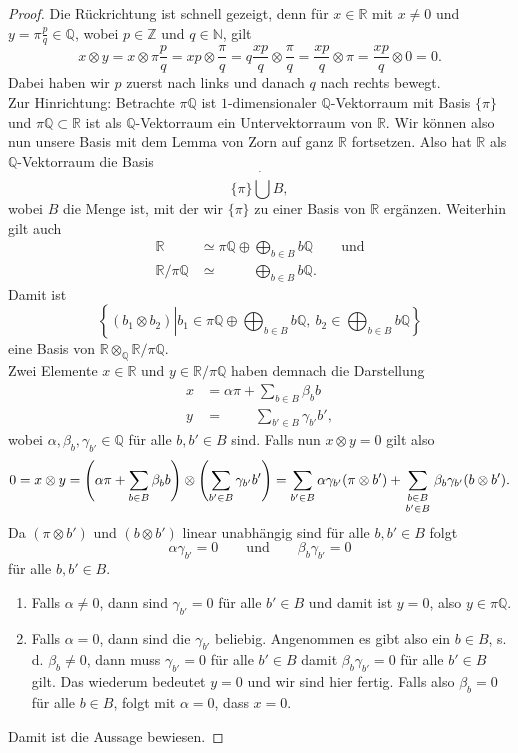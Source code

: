 \documentclass[11pt,titlepage]{article}
\newcommand{\setN}{\mathbb{N}}
\newcommand{\setZ}{\mathbb{Z}}
\newcommand{\setQ}{\mathbb{Q}}
\newcommand{\setR}{\mathbb{R}}
\theoremstyle{definition}
\theoremstyle{remark}
\begin{document}
	\begin{proof}
		Die Rückrichtung ist schnell gezeigt, 
		denn für $x\in\setR$ mit $x\neq 0$ und $y=\pi\frac{p}{q}\in\setQ$, wobei $p\in\setZ$ und $q\in\setN$, gilt
		\[ x\otimes y =x\otimes\pi \frac{p}{q} =xp\otimes\frac{\pi}{q} =q\frac{xp}{q}
		\otimes\frac{\pi}{q} = \frac{xp}{q}\otimes\pi =\frac{xp}{q}\otimes 0=0.\]
		Dabei haben wir $p$ zuerst nach links und danach $q$ nach rechts bewegt. \\
		Zur Hinrichtung: Betrachte $\pi\setQ$ ist $1$-dimensionaler 
		$\setQ$-Vektorraum mit Basis $\{\pi\}$ und $\pi\setQ\subset\setR$ ist 
		als $\setQ$-Vektorraum ein 
		Untervektorraum von $\setR$. Wir können also nun 
		unsere Basis mit dem Lemma von Zorn auf ganz $\setR$ fortsetzen. 
		Also hat $\setR$ als $\setQ$-Vektorraum die Basis
		\[\{\pi\}\dot\bigcup B,\]
		wobei $B$ die Menge ist, mit der wir $\{\pi\}$ zu einer Basis von $\setR$ 
		ergänzen. Weiterhin gilt auch
		\begin{align*}
			\setR&\simeq\pi\setQ\oplus\bigoplus_{b\in B}b\setQ\qquad\text{und}\\
			\setR /\pi\setQ&\simeq\qquad\ \ \bigoplus_{b\in B}b\setQ.
		\end{align*}
		Damit ist
		\[\left\{(b_1\otimes b_2)\left\vert b_1\in\pi\setQ\oplus\bigoplus_{b\in B}b\setQ,\ b_2\in \bigoplus_{b\in B}b\setQ\right\}\right.\]
		eine Basis von $\setR\otimes_\setQ\setR/\pi\setQ$. \\
		Zwei Elemente $x\in\setR$ und $y\in\setR/\pi\setQ$ haben demnach die 
		Darstellung
		\begin{align*}
			x&=\alpha\pi+\sum_{b\in B}\beta_b b \\
			y&= \qquad\ \sum_{b'\in B}\gamma_{b'}b',
		\end{align*}
		wobei $\alpha,\beta_b,\gamma_{b'}\in\setQ$ für alle $b,b'\in B$ sind. 
		Falls nun $x\otimes y=0$ gilt also
		\[0=x\otimes y=\left(\alpha\pi+\sum_{b\in B}\beta_b b\right)\otimes
		\left(\sum_{b'\in B}\gamma_{b'}b'\right)=\sum_{b'\in 
		B}\alpha\gamma_{b'}(\pi\otimes b')+\sum_{\genfrac{}{}{0pt}{1}{b\in B}
		{b'\in B}} \beta_b\gamma_{b'}(b\otimes b').\]
		Da $(\pi\otimes b')$ und $(b\otimes b')$ linear unabhängig sind für alle  
		$b,b'\in B$ folgt
		\[\alpha\gamma_{b'}=0\qquad\text{und}\qquad \beta_b\gamma_{b'}=0\]
		für alle $b,b'\in B$. 
		\begin{enumerate}
			\item Falls $\alpha\neq 0$, dann sind $\gamma_{b'}=0$ für alle 
			$b'\in B$ und damit ist $y=0$, also $y\in \pi\setQ$.
			\item Falls $\alpha=0$, dann sind die $\gamma_{b'}$ beliebig. 
			Angenommen es gibt also ein $b\in B$, s. d. $\beta_b \neq 0$, dann 
			muss $\gamma_{b'}=0$ für alle $b'\in B$ damit $\beta_b\gamma_{b'}=0$ 
			für alle $b'\in B$ gilt. Das wiederum bedeutet $y=0$ und wir sind hier 
			fertig. Falls also $\beta_b=0$ für alle $b\in B$, folgt mit $\alpha=0$, 
			dass $x=0$.
		\end{enumerate}
		Damit ist die Aussage bewiesen.
	\end{proof}
\end{document}
